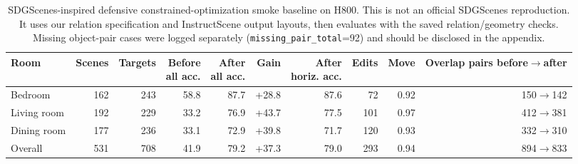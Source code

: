 \begin{table}[t]
\centering
\small
\caption{SDGScenes-inspired defensive constrained-optimization smoke baseline on H800. This is not an official SDGScenes reproduction. It uses our relation specification and InstructScene output layouts, then evaluates with the saved relation/geometry checks. Missing object-pair cases were logged separately (\texttt{missing\_pair\_total}=92) and should be disclosed in the appendix.}
\label{tab:sdgscenes_defensive_smoke}
\begin{tabular}{lrrrrrrrrr}
\toprule
Room & Scenes & Targets & \makecell{Before\\all acc.} & \makecell{After\\all acc.} & Gain & \makecell{After\\horiz. acc.} & Edits & Move & \makecell{Overlap pairs\\before$\rightarrow$after} \\
\midrule
Bedroom & 162 & 243 & 58.8 & 87.7 & +28.8 & 87.6 & 72 & 0.92 & 150$\rightarrow$142 \\
Living room & 192 & 229 & 33.2 & 76.9 & +43.7 & 77.5 & 101 & 0.97 & 412$\rightarrow$381 \\
Dining room & 177 & 236 & 33.1 & 72.9 & +39.8 & 71.7 & 120 & 0.93 & 332$\rightarrow$310 \\
\midrule
Overall & 531 & 708 & 41.9 & 79.2 & +37.3 & 79.0 & 293 & 0.94 & 894$\rightarrow$833 \\
\bottomrule
\end{tabular}
\end{table}

